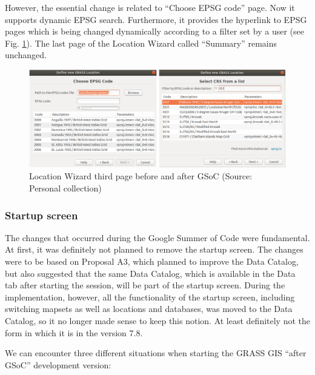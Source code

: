 \documentclass[a4paper,10pt,twoside]{article}
\begin{document}
\newpage
However, the essential change is related to ``Choose EPSG code'' page. Now it supports dynamic EPSG search. Furthermore, it provides the hyperlink to EPSG pages which is being changed dynamically according to a filter set by a user (see Fig. \ref{fig:loc_wiz_3}). The last page of the Location Wizard called ``Summary'' remains unchanged.


\vspace{0.3cm}
\begin{figure}[hbt!] 
\begin{center}
\includegraphics[width=17cm]{../pictures/loc_wiz_3.png} 
\caption[Location Wizard third page before and after GSoC)]{Location Wizard third page before and after GSoC (Source: Personal collection)}
\label{fig:loc_wiz_3}
\end{center}
\end{figure}

\vspace*{-1cm}
\subsubsection{Startup screen}

The changes that occurred during the Google Summer of Code were fundamental. At first, it was definitely not planned to remove the startup screen. The changes were to be based on Proposal A3, which planned to improve the Data Catalog, but also suggested that the same Data Catalog, which is available in the Data tab after starting the session, will be part of the startup screen.
During the implementation, however, all the functionality of the startup screen, including switching mapsets as well as locations and databases, was moved to the Data Catalog, so it no longer made sense to keep this notion. At least definitely not the form in which it is in the version 7.8.

\noindent We can encounter three different situations when starting the GRASS GIS ``after GSoC'' development version:
\end{document}

